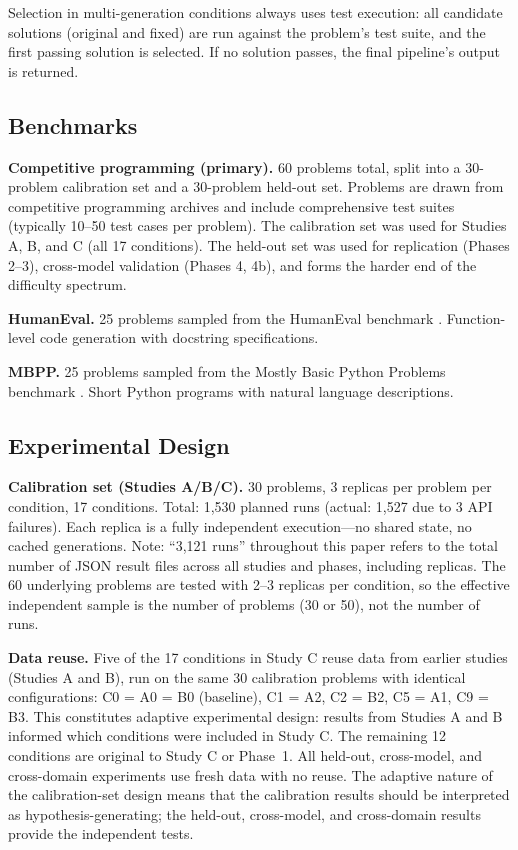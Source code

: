 \documentclass{article}
\begin{document}
Selection in multi-generation conditions always uses test execution: all candidate solutions (original and fixed) are run against the problem's test suite, and the first passing solution is selected. If no solution passes, the final pipeline's output is returned.

\subsection{Benchmarks}

\textbf{Competitive programming (primary).} 60 problems total, split into a 30-problem calibration set and a 30-problem held-out set. Problems are drawn from competitive programming archives and include comprehensive test suites (typically 10--50 test cases per problem). The calibration set was used for Studies A, B, and C (all 17 conditions). The held-out set was used for replication (Phases 2--3), cross-model validation (Phases 4, 4b), and forms the harder end of the difficulty spectrum.

\textbf{HumanEval.} 25 problems sampled from the HumanEval benchmark \citep{chen2021evaluating}. Function-level code generation with docstring specifications.

\textbf{MBPP.} 25 problems sampled from the Mostly Basic Python Problems benchmark \citep{austin2021program}. Short Python programs with natural language descriptions.

\subsection{Experimental Design}

\textbf{Calibration set (Studies A/B/C).} 30 problems, 3 replicas per problem per condition, 17 conditions. Total: 1,530 planned runs (actual: 1,527 due to 3 API failures). Each replica is a fully independent execution---no shared state, no cached generations. Note: ``3,121 runs'' throughout this paper refers to the total number of JSON result files across all studies and phases, including replicas. The 60 underlying problems are tested with 2--3 replicas per condition, so the effective independent sample is the number of problems (30 or 50), not the number of runs.

\textbf{Data reuse.} Five of the 17 conditions in Study C reuse data from earlier studies (Studies A and B), run on the same 30 calibration problems with identical configurations: C0 = A0 = B0 (baseline), C1 = A2, C2 = B2, C5 = A1, C9 = B3. This constitutes adaptive experimental design: results from Studies A and B informed which conditions were included in Study C. The remaining 12 conditions are original to Study C or Phase~1. All held-out, cross-model, and cross-domain experiments use fresh data with no reuse. The adaptive nature of the calibration-set design means that the calibration results should be interpreted as hypothesis-generating; the held-out, cross-model, and cross-domain results provide the independent tests.
\end{document}
